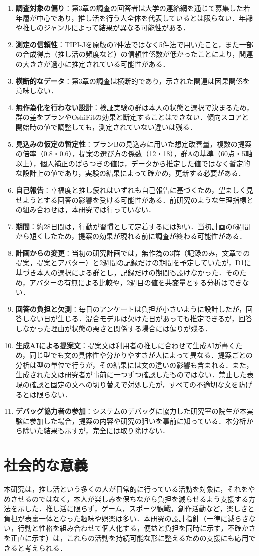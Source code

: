 \begin{enumerate}
\item \textbf{調査対象の偏り}：第3章の調査の回答者は大学の連絡網を通じて募集した若年層が中心であり，推し活を行う人全体を代表しているとは限らない．年齢や推しのジャンルによって結果が異なる可能性がある．
\item \textbf{測定の信頼性}：TIPI-Jを原版の7件法ではなく5件法で用いたこと，また一部の合成得点（推し活の頻度など）の信頼性係数が低かったことにより，関連の大きさが過小に推定されている可能性がある．
\item \textbf{横断的なデータ}：第3章の調査は横断的であり，示された関連は因果関係を意味しない．
\item \textbf{無作為化を行わない設計}：検証実験の群は本人の状態と選択で決まるため，群の差をプランやOshiFitの効果と断定することはできない．傾向スコアと開始時の値で調整しても，測定されていない違いは残る．
\item \textbf{見込みの仮定の暫定性}：プランBの見込みに用いた想定改善量，複数の提案の倍率（0.8・0.6），提案の選び方の係数（12・18），群Aの基準（60点・5軸以上），個人補正のばらつきの値は，データから推定した値ではなく暫定的な設計上の値であり，実験の結果によって確かめ，更新する必要がある．
\item \textbf{自己報告}：幸福度と推し疲れはいずれも自己報告に基づくため，望ましく見せようとする回答の影響を受ける可能性がある．前研究のような生理指標との組み合わせは，本研究では行っていない．
\item \textbf{期間}：約28日間は，行動が習慣として定着するには短い\cite{lally2010}．当初計画の6週間から短くしたため，提案の効果が現れる前に調査が終わる可能性がある．
\item \textbf{計画からの変更}：当初の研究計画では，無作為の3群（記録のみ，文章での提案，提案とアバター）と2週間の記録だけの期間を予定していたが，D1に基づき本人の選択による群とし，記録だけの期間も設けなかった．そのため，アバターの有無による比較や，2週目の値を共変量とする分析はできない．
\item \textbf{回答の負担と欠測}：毎日のアンケートは負担が小さいように設計したが，回答しない日が生じる．混合モデルは欠けた日があっても推定できるが，回答しなかった理由が状態の悪さと関係する場合には偏りが残る．
\item \textbf{生成AIによる提案文}：提案文は利用者の推しに合わせて生成AIが書くため，同じ型でも文の具体性や分かりやすさが人によって異なる．提案ごとの分析は型の単位で行うが，その結果には文の違いの影響も含まれる．また，生成された文は研究者が事前に一つずつ確認したものではない．禁止した表現の確認と固定の文への切り替えで対処したが，すべての不適切な文を防げるとは限らない．
\item \textbf{デバッグ協力者の参加}：システムのデバッグに協力した研究室の院生が本実験に参加した場合，提案の内容や研究の狙いを事前に知っている．本分析から除いた結果も示すが，完全には取り除けない．
\end{enumerate}

\section{社会的な意義}
本研究は，推し活という多くの人が日常的に行っている活動を対象に，それをやめさせるのではなく，本人が楽しみを保ちながら負担を減らせるよう支援する方法を示した．推し活に限らず，ゲーム，スポーツ観戦，創作活動など，楽しさと負担が表裏一体となった趣味や娯楽は多い．本研究の設計指針（一律に減らさない，行動と性格を組み合わせて個人化する，便益と負担を同時に示す，不確かさを正直に示す）は，これらの活動を持続可能な形に整えるための支援にも応用できると考えられる．
